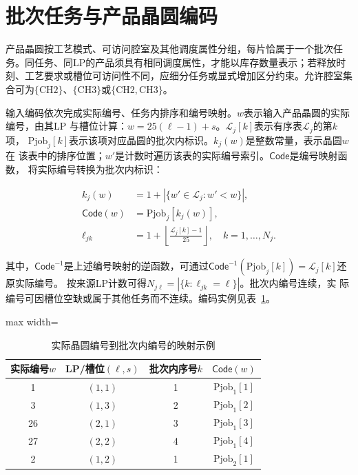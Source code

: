 \section{批次任务与产品晶圆编码}
\label{sec:model-encoding-cn}

产品晶圆按工艺模式、可访问腔室及其他调度属性分组，每片恰属于一个批次任务。同任务、同LP的产品须具有相同调度属性，才能以库存数量表示；若释放时刻、工艺要求或槽位可访问性不同，应细分任务或显式增加区分约束。允许腔室集合可为$\{\mathrm{CH2}\}$、$\{\mathrm{CH3}\}$或$\{\mathrm{CH2},\mathrm{CH3}\}$。

输入编码依次完成实际编号、任务内排序和编号映射。$w$表示输入产品晶圆的实际编号，由其LP
与槽位计算：$w=25(\ell-1)+s$。$\mathcal L_j[k]$表示有序表$\mathcal L_j$的第$k$项，
$\mathrm{Pjob}_j[k]$表示该项对应晶圆的批次内标识。$k_j(w)$是整数常量，表示晶圆$w$在
该表中的排序位置；$w'$是计数时遍历该表的实际编号索引。$\mathsf{Code}$是编号映射函数，
将实际编号转换为批次内标识：

\begin{equation}
\begin{aligned}
k_j(w)&=1+|\{w'\in\mathcal L_j:w'<w\}|,\\
\mathsf{Code}(w)&=\mathrm{Pjob}_j[k_j(w)],\\
\ell_{jk}&=1+\left\lfloor\frac{\mathcal L_j[k]-1}{25}\right\rfloor,
\quad k=1,\ldots,N_j.
\end{aligned}
\label{eq:pjob-input-code-cn}
\end{equation}

其中，$\mathsf{Code}^{-1}$是上述编号映射的逆函数，可通过$\mathsf{Code}^{-1}(\mathrm{Pjob}_j[k])=\mathcal L_j[k]$还原实际编号。
按来源LP计数可得$N_{j\ell}=|\{k:\ell_{jk}=\ell\}|$。批次内编号连续，实
际编号可因槽位空缺或属于其他任务而不连续。编码实例见表~\ref{tab:pjob-code-example-cn}。

\begin{table}[!htbp]
\centering\footnotesize
\caption{实际晶圆编号到批次内编号的映射示例}
\label{tab:pjob-code-example-cn}
\begin{adjustbox}{max width=\linewidth}
\begin{tabular}{cccc}
\toprule
实际编号$w$ & LP/槽位$(\ell,s)$ & 批次内序号$k$ & $\mathsf{Code}(w)$\\
\midrule
1 & $(1,1)$ & 1 & $\mathrm{Pjob}_1[1]$\\
3 & $(1,3)$ & 2 & $\mathrm{Pjob}_1[2]$\\
26 & $(2,1)$ & 3 & $\mathrm{Pjob}_1[3]$\\
27 & $(2,2)$ & 4 & $\mathrm{Pjob}_1[4]$\\
2 & $(1,2)$ & 1 & $\mathrm{Pjob}_2[1]$\\
\bottomrule
\end{tabular}
\end{adjustbox}
\end{table}

